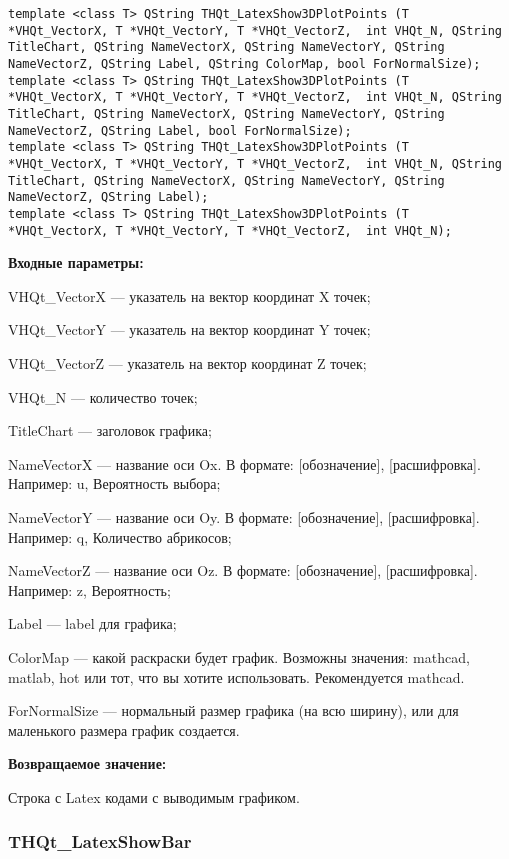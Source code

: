\documentclass[a4paper,12pt]{article}
\begin{document}
\begin{lstlisting}[label=code_syntax_THQt_LatexShow3DPlotPoints,caption=Синтаксис]
template <class T> QString THQt_LatexShow3DPlotPoints (T *VHQt_VectorX, T *VHQt_VectorY, T *VHQt_VectorZ,  int VHQt_N, QString TitleChart, QString NameVectorX, QString NameVectorY, QString NameVectorZ, QString Label, QString ColorMap, bool ForNormalSize);
template <class T> QString THQt_LatexShow3DPlotPoints (T *VHQt_VectorX, T *VHQt_VectorY, T *VHQt_VectorZ,  int VHQt_N, QString TitleChart, QString NameVectorX, QString NameVectorY, QString NameVectorZ, QString Label, bool ForNormalSize);
template <class T> QString THQt_LatexShow3DPlotPoints (T *VHQt_VectorX, T *VHQt_VectorY, T *VHQt_VectorZ,  int VHQt_N, QString TitleChart, QString NameVectorX, QString NameVectorY, QString NameVectorZ, QString Label);
template <class T> QString THQt_LatexShow3DPlotPoints (T *VHQt_VectorX, T *VHQt_VectorY, T *VHQt_VectorZ,  int VHQt_N);
\end{lstlisting}

\textbf{Входные параметры:}

VHQt\_VectorX --- указатель на вектор координат X точек;
 
VHQt\_VectorY --- указатель на вектор координат Y точек;
 
VHQt\_VectorZ --- указатель на вектор координат Z точек;
 
VHQt\_N --- количество точек;
 
TitleChart --- заголовок графика;
 
NameVectorX --- название оси Ox. В формате: [обозначение], [расшифровка]. Например: u, Вероятность выбора;
 
NameVectorY --- название оси Oy. В формате: [обозначение], [расшифровка]. Например: q, Количество абрикосов;
 
NameVectorZ --- название оси Oz. В формате: [обозначение], [расшифровка]. Например: z, Вероятность;
 
Label --- label для графика;
 
ColorMap --- какой раскраски будет график. Возможны значения: mathcad, matlab, hot или тот, что вы хотите использовать. Рекомендуется mathcad.
 
ForNormalSize --- нормальный размер графика (на всю ширину), или для маленького размера график создается.
	
\textbf{Возвращаемое значение:}

Строка с Latex кодами с выводимым графиком.


\subsubsection{THQt\_LatexShowBar}\label{THQt_LatexShowBar}
\end{document}
